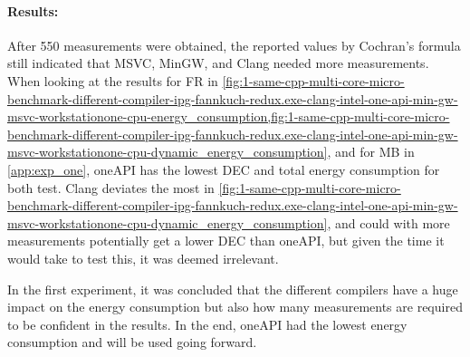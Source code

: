 


\paragraph{Results:} After 550 measurements were obtained, the reported values by Cochran's formula still indicated that MSVC, MinGW, and Clang needed more measurements. When looking at the results for FR in \cref{fig:1-same-cpp-multi-core-micro-benchmark-different-compiler-ipg-fannkuch-redux.exe-clang-intel-one-api-min-gw-msvc-workstationone-cpu-energy_consumption,fig:1-same-cpp-multi-core-micro-benchmark-different-compiler-ipg-fannkuch-redux.exe-clang-intel-one-api-min-gw-msvc-workstationone-cpu-dynamic_energy_consumption}, and for MB in \cref{app:exp_one}, oneAPI has the lowest DEC and total energy consumption for both test. Clang deviates the most in \cref{fig:1-same-cpp-multi-core-micro-benchmark-different-compiler-ipg-fannkuch-redux.exe-clang-intel-one-api-min-gw-msvc-workstationone-cpu-dynamic_energy_consumption}, and could with more measurements potentially get a lower DEC than oneAPI, but given the time it would take to test this, it was deemed irrelevant.

In the first experiment, it was concluded that the different compilers have a huge impact on the energy consumption but also how many measurements are required to be confident in the results. In the end, oneAPI had the lowest energy consumption and will be used going forward.


